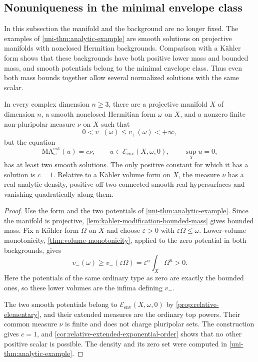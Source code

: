 \subsection{Nonuniqueness in the minimal envelope class}

In this subsection the manifold and the background are no longer fixed. The examples of \cref{uni-thm:analytic-example} are smooth solutions on projective manifolds with nonclosed Hermitian backgrounds. Comparison with a K\"ahler form shows that these backgrounds have both positive lower mass and bounded mass, and smooth potentials belong to the minimal envelope class. Thus even both mass bounds together allow several normalized solutions with the same scalar.

\begin{corollary}\label{cor:analytic-nonuniqueness-envelope-class}
In every complex dimension $n\geq3$, there are a projective manifold $X$ of dimension $n$, a smooth nonclosed Hermitian form $\omega$ on $X$, and a nonzero finite non-pluripolar measure $\nu$ on $X$ such that
\[
 0<v_-(\omega)\leq v_+(\omega)<+\infty,
\]
but the equation
\[
 \mathrm{MA}^{\mathrm{ext}}_\omega(u)=c\nu,
 \qquad u\in\mathcal E_{\mathrm{env}}(X,\omega,0),
 \qquad \sup_Xu=0,
\]
has at least two smooth solutions. The only positive constant for which it has a solution is $c=1$. Relative to a K\"ahler volume form on $X$, the measure $\nu$ has a real analytic density, positive off two connected smooth real hypersurfaces and vanishing quadratically along them.
\end{corollary}
\begin{proof}
Use the form and the two potentials of \cref{uni-thm:analytic-example}. Since the manifold is projective, \cref{lem:kahler-modification-bounded-mass} gives bounded mass. Fix a K\"ahler form $\Omega$ on $X$ and choose $\varepsilon>0$ with $\varepsilon\Omega\leq\omega$. Lower-volume monotonicity, \cref{thm:volume-monotonicity}, applied to the zero potential in both backgrounds, gives
\[
 v_-(\omega)\geq v_-(\varepsilon\Omega)
 =\varepsilon^n\int_X\Omega^n>0.
\]
Here the potentials of the same ordinary type as zero are exactly the bounded ones, so these lower volumes are the infima defining $v_-$.

The two smooth potentials belong to $\mathcal E_{\mathrm{env}}(X,\omega,0)$ by \cref{prop:relative-elementary}, and their extended measures are the ordinary top powers. Their common measure $\nu$ is finite and does not charge pluripolar sets. The construction gives $c=1$, and \cref{cor:relative-extended-exponential-order} shows that no other positive scalar is possible. The density and its zero set were computed in \cref{uni-thm:analytic-example}.
\end{proof}
